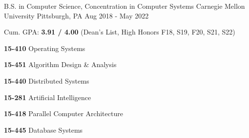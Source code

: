 
\begin{cventries}

  \cventry
    {B.S. in Computer Science, Concentration in Computer Systems} %
    {Carnegie Mellon University} %
    {Pittsburgh, PA} %
    {Aug 2018 - May 2022} %
    {
      \begin{cvitems} %
	  \item {Cum. GPA: \textbf{3.91 / 4.00} (Dean's List, High Honors F18, S19, F20, S21, S22)}
        \item {}
            \vspace{0.5mm}
            \setlength\multicolsep{0pt}
            \begin{multicols}{3}
              \item[] {\textbf{15-410} Operating Systems}
              \item[] {\textbf{15-451} Algorithm Design \& Analysis}
              \item[] {\textbf{15-440} Distributed Systems}
              \item[] {\textbf{15-281} Artificial Intelligence}
              \item[] {\textbf{15-418} Parallel Computer Architecture}
              \item[] {\textbf{15-445} Database Systems}
            \end{multicols}
      \end{cvitems}
    }

\end{cventries}
